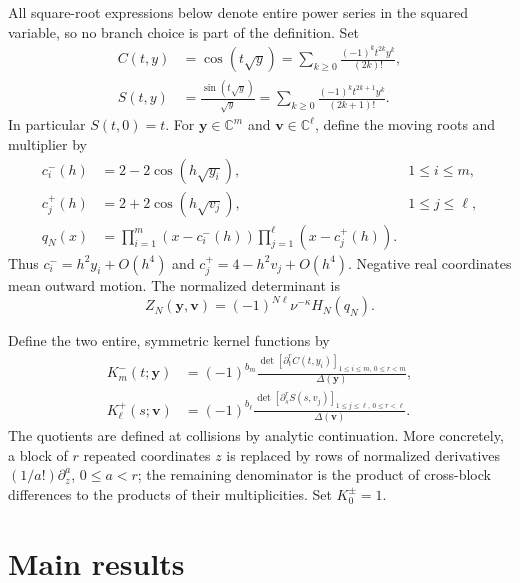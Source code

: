 \documentclass[11pt,a4paper]{article}
\numberwithin{equation}{section}
\theoremstyle{definition}
\theoremstyle{remark}
\newcommand{\CC}{\mathbb C}
\newcommand{\by}{\boldsymbol{y}}
\newcommand{\Del}{\Delta}
\newcommand{\bv}{\boldsymbol v}
\begin{document}
All square-root expressions below denote entire power series in the
squared variable, so no branch choice is part of the definition. Set
\begin{align}
 C(t,y)&=\cos(t\sqrt y)
       =\sum_{k\ge0}\frac{(-1)^k t^{2k}y^k}{(2k)!},\label{tec:eq:CSa}\\
 S(t,y)&=\frac{\sin(t\sqrt y)}{\sqrt y}
       =\sum_{k\ge0}\frac{(-1)^k t^{2k+1}y^k}{(2k+1)!}.
       \label{tec:eq:CSb}
\end{align}
In particular $S(t,0)=t$. For $\by\in\CC^m$ and $\bv\in\CC^\ell$,
define the moving roots and multiplier by
\begin{align}
 c_i^-(h)&=2-2\cos(h\sqrt{y_i}), &1\le i\le m,\\
 c_j^+(h)&=2+2\cos(h\sqrt{v_j}), &1\le j\le\ell,\label{tec:eq:roots}\\
 q_N(x)&=\prod_{i=1}^m(x-c_i^-(h))
          \prod_{j=1}^{\ell}(x-c_j^+(h)).
\end{align}
Thus $c_i^-=h^2y_i+O(h^4)$ and
$c_j^+=4-h^2v_j+O(h^4)$. Negative real coordinates mean outward motion.
The normalized determinant is
\begin{equation}\label{tec:eq:ZN}
 Z_N(\by,\bv)=(-1)^{N\ell}\nu^{-\kappa}H_N(q_N).
\end{equation}

Define the two entire, symmetric kernel functions by
\begin{align}
 K_m^-(t;\by)
 &=(-1)^{b_m}\frac{\det[\partial_t^r C(t,y_i)]_
             {1\le i\le m,\ 0\le r<m}}{\Del(\by)},\label{tec:eq:Km}\\
 K_\ell^+(s;\bv)
 &=(-1)^{b_\ell}\frac{\det[\partial_s^r S(s,v_j)]_
             {1\le j\le\ell,\ 0\le r<\ell}}{\Del(\bv)}.
             \label{tec:eq:Kp}
\end{align}
The quotients are defined at collisions by analytic continuation. More
concretely, a block of $r$ repeated coordinates $z$ is replaced by rows
of normalized derivatives $(1/a!)\partial_z^a$, $0\le a<r$; the
remaining denominator is the product of cross-block differences to the
products of their multiplicities. Set $K_0^\pm=1$.

\section{Main results}\label{tec:sec:main}
\end{document}
